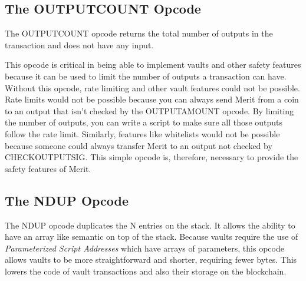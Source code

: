 \documentclass{article}
\begin{document}
\subsection{The OUTPUTCOUNT Opcode}

\begin{center}
\end{center}

The OUTPUTCOUNT opcode returns the total number of outputs in the transaction and
does not have any input.

This opcode is critical in being able to implement vaults and other safety features
because it can be used to limit the number of outputs a transaction can have.
Without this opcode, rate limiting and other vault features could not be possible.
Rate limits would not be possible because you can always send Merit from a coin
to an output that isn't checked by the OUTPUTAMOUNT opcode. By limiting the number
of outputs, you can write a script to make sure all those outputs follow the rate
limit. Similarly, features like whitelists would not be possible because someone
could always transfer Merit to an output not checked by CHECKOUTPUTSIG. This
simple opcode is, therefore, necessary to provide the safety features of Merit.

\subsection{The NDUP Opcode}

\begin{center}
\end{center}

The NDUP opcode duplicates the N entries on the stack. It allows the ability to 
have an array like semantic on top of the stack. Because vaults require the use of
\emph{Parameterized Script Addresses} which have arrays of parameters, this opcode
allows vaults to be more straightforward and shorter, requiring fewer bytes.
This lowers the code of vault transactions and also their storage on the
blockchain.
\end{document}

